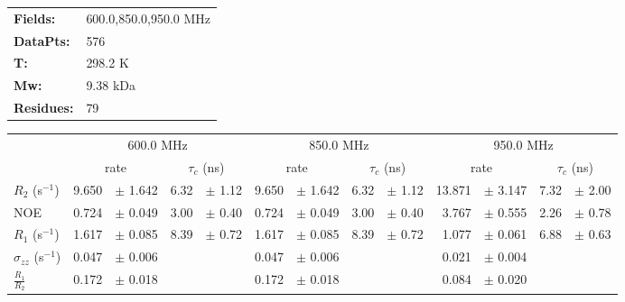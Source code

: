 \documentclass[showkeys,aps,prb,prepreint,amssymb, amsmath,nobibnotes]{article}
\begin{document}
\begin{tabular}{ll}
\textbf{Fields:} &  600.0,850.0,950.0 MHz\\
\textbf{DataPts:} &  576\\
 \textbf{T:} & 298.2 K\\
\textbf{Mw:} & 9.38 kDa\\
\textbf{Residues: } &   79\\
\end{tabular}

\begin{small}
\noindent \begin{tabular}{l|rlrl|rlrl|rlrl}
& \multicolumn{4}{c}{600.0 MHz}& \multicolumn{4}{c}{850.0 MHz}& \multicolumn{4}{c}{950.0 MHz}\\
&  \multicolumn{2}{c}{rate} & \multicolumn{2}{c}{$\tau_c$ (ns)}   &  \multicolumn{2}{c}{rate} & \multicolumn{2}{c}{$\tau_c$ (ns)}   &  \multicolumn{2}{c}{rate} & \multicolumn{2}{c}{$\tau_c$ (ns)}   \\
\hline$R_2$  (s$^{-1}$)  &  9.650 & $\pm$ 1.642   &  6.32 & $\pm$ 1.12 &  9.650 & $\pm$ 1.642   &  6.32 & $\pm$ 1.12 &  13.871 & $\pm$ 3.147   &  7.32 & $\pm$ 2.00 \\
NOE  &  0.724 & $\pm$ 0.049   &  3.00 & $\pm$ 0.40 &  0.724 & $\pm$ 0.049   &  3.00 & $\pm$ 0.40 &  3.767 & $\pm$ 0.555   &  2.26 & $\pm$ 0.78 \\
$R_1$ (s$^{-1}$)  &  1.617 & $\pm$ 0.085   &  8.39 & $\pm$ 0.72 &  1.617 & $\pm$ 0.085   &  8.39 & $\pm$ 0.72 &  1.077 & $\pm$ 0.061   &  6.88 & $\pm$ 0.63 \\
$\sigma_{zz}$  (s$^{-1}$)  &  0.047 & $\pm$ 0.006   & & &  0.047 & $\pm$ 0.006   & & &  0.021 & $\pm$ 0.004   & & \\
$\frac{R_1}{R_2}$  &  0.172 & $\pm$ 0.018   & & &  0.172 & $\pm$ 0.018   & & &  0.084 & $\pm$ 0.020   & & \\
\end{tabular}
\end{small}
\end{document}
